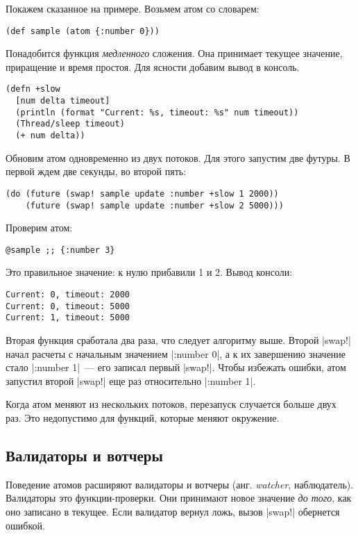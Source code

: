 Покажем сказанное на примере. Возьмем атом со словарем:

\begin{verbatim}
(def sample (atom {:number 0}))
\end{verbatim}

Понадобится функция \emph{медленного} сложения. Она принимает текущее значение,
приращение и время простоя. Для ясности добавим вывод в консоль.

\begin{verbatim}
(defn +slow
  [num delta timeout]
  (println (format "Current: %s, timeout: %s" num timeout))
  (Thread/sleep timeout)
  (+ num delta))
\end{verbatim}

Обновим атом одновременно из двух потоков. Для этого запустим две футуры. В
первой ждем две секунды, во второй пять:

\begin{verbatim}
(do (future (swap! sample update :number +slow 1 2000))
    (future (swap! sample update :number +slow 2 5000)))
\end{verbatim}

\noindent
Проверим атом:

\begin{verbatim}
@sample ;; {:number 3}
\end{verbatim}

\noindent
Это правильное значение: к нулю прибавили 1 и 2. Вывод консоли:

\begin{verbatim}
Current: 0, timeout: 2000
Current: 0, timeout: 5000
Current: 1, timeout: 5000
\end{verbatim}

Вторая функция сработала два раза, что следует алгоритму выше. Второй
\spverb|swap!| начал расчеты с начальным значением \spverb|{:number 0}|, а к их
завершению значение стало \spverb|{:number 1}|~--- его записал первый
\spverb|swap!|. Чтобы избежать ошибки, атом запустил второй \spverb|swap!| еще
раз относительно \spverb|{:number 1}|.

Когда атом меняют из нескольких потоков, перезапуск случается больше двух
раз. Это недопустимо для функций, которые меняют окружение.

\subsection{Валидаторы и вотчеры}

Поведение атомов расширяют валидаторы и вотчеры (анг. \emph{watcher},
наблюдатель). Валидаторы это функции-проверки. Они принимают новое значение
\emph{до того}, как оно записано в текущее. Если валидатор вернул ложь, вызов
\spverb|swap!| обернется ошибкой.

